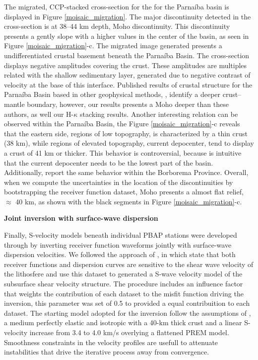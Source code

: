 \documentclass[paper,11pt]{geophysics}
\begin{document}
The migrated, CCP-stacked cross-section for the for the Parnaíba basin is displayed in Figure \ref{moisaic_migration}. The major discontinuity detected in the cross-section is at 38–44 km depth, Moho discontinuity. This discontinuity presents a gently slope with a higher values in the center of the basin, as seen in Figure \ref{moisaic_migration}-c. The migrated image generated presents a undifferentiated crustal basement beneath the Parnaíba Basin.  The cross-section displays negative amplitudes covering the crust. These amplitudes are multiples related with the shallow sedimentary layer, generated due to negative contrast of velocity at the base of this interface. Published results of crustal structure for the Parnaíba Basin based in other geophysical methods, \citep{de_castro_crustal_2014,daly_brasiliano_2014}, identify a deeper crust–mantle boundary, however, our results presents a Moho deeper than these authors, as well our H-$\kappa$ stacking results. Another interesting relation can be observed within the Parnaíba Basin, the Figure \ref{moisaic_migration}-c reveals that the eastern side, regions of low topography, is characterized by a thin crust (38 km), while regions of elevated topography, current depocenter, tend to display a crust of 41 km or thicker. This behavior is controversial, because is intuitive that the current depocenter needs to be the lowest part of the basin. Additionally, \cite{almeida_crustal_2015} report the same behavior within the Borborema Province. Overall, when we compute the uncertainties in the location of the discontinuities by bootstrapping the receiver function dataset, Moho presents a almost flat relief, $\approx$ 40 km, as shown with the black segments in Figure \ref{moisaic_migration}-c.
\linebreak

\begin{flushleft}
\textbf{Joint inversion with surface-wave dispersion}
\end{flushleft}

Finally, S-velocity models beneath individual PBAP stations were developed through by inverting receiver function waveforms jointly with surface-wave dispersion velocities. We followed the approach of \cite{julia_joint_2000,julia_lithospheric_2003}, in which state that both receiver functions and dispersion curves are sensitive to the shear wave velocity of the lithosfere and use this dataset to generated a S-wave velocity model of the subsurface shear velocity structure. The procedure includes an influence factor that weights the contribution of each dataset to the misfit function driving the inversion, this parameter was set of 0.5 to provided a equal contribuition to each dataset. The starting model adopted for the inversion follow the assumptions of \cite{julia_deep_2008}, a medium perfectly elastic and isotropic with a 40-km thick crust and a linear S-velocity increase from 3.4 to
4.0 km/s overlying a flattened PREM model. Smoothness constraints in the velocity profiles are usefull to attenuate instabilities that drive the iterative process away from convergence.
\end{document}
